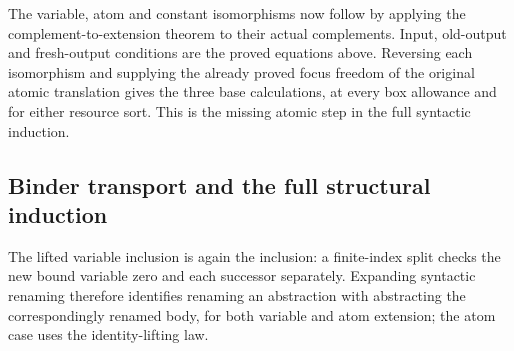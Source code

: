 



The variable, atom and constant isomorphisms now follow by applying the
complement-to-extension theorem to their actual complements. Input, old-output
and fresh-output conditions are the proved equations above. Reversing each
isomorphism and supplying the already proved focus freedom of the original
atomic translation gives the three base calculations, at every box allowance
and for either resource sort. This is the missing atomic step in the full
syntactic induction.







\subsection{Binder transport and the full structural induction}

The lifted variable inclusion is again the inclusion: a finite-index split
checks the new bound variable zero and each successor separately. Expanding
syntactic renaming therefore identifies renaming an abstraction with
abstracting the correspondingly renamed body, for both variable and atom
extension; the atom case uses the identity-lifting law.




